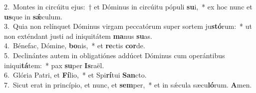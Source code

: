 {2.~}Montes in circúitu ejus:~† et Dóminus in circúitu pópuli \textbf{su}i,~* ex hoc nunc et \textbf{us}que in \textbf{sǽ}culum.\\
{3.~}Quia non relínquet Dóminus virgam peccatórum super sortem ju\textbf{stó}rum:~* ut non exténdant justi ad iniquitátem \textbf{ma}nus \textbf{su}as.\\
{4.~}Bénefac, Dómine, \textbf{bo}nis,~* et \textbf{re}ctis \textbf{cor}de.\\
{5.~}Declinántes autem in obligatiónes addúcet Dóminus cum operántibus iniqui\textbf{tá}tem:~* pax \textbf{su}per \textbf{Is}raël.\\
{6.~}Glória Patri, et \textbf{Fí}lio,~* et Spi\textbf{rí}tui \textbf{San}cto.\\
{7.~}Sicut erat in princípio, et nunc, et \textbf{sem}per,~* et in sǽcula sæcu\textbf{ló}rum. \textbf{A}men.\\
